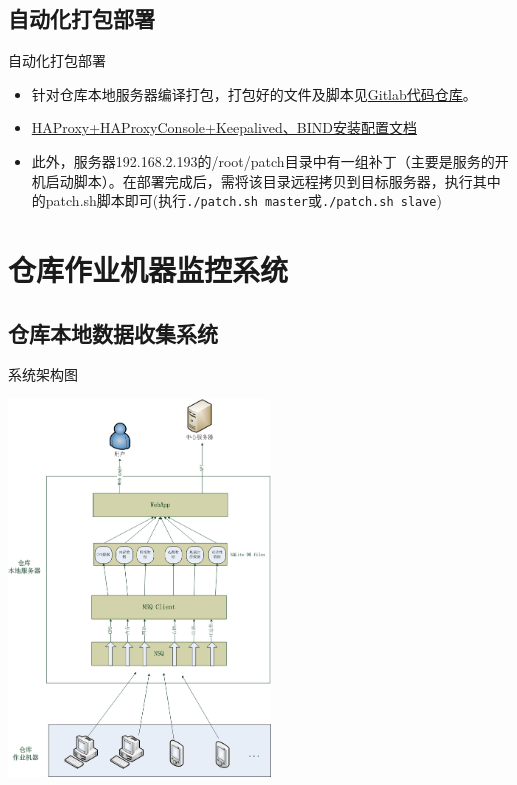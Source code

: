 \documentclass[CJK]{beamer}
\begin{document}
\begin{CJK*}{UTF8}{gbsn}
\subsection{自动化打包部署}
\begin{frame}[containsverbatim]{自动化打包部署}
\begin{itemize}
\item 针对仓库本地服务器编译打包，打包好的文件及脚本见\href{http://10.24.178.60:8000/yongfengxia/deploy_packages}{Gitlab代码仓库}。
\item \href{run:HAProxy_HAProxyConsole_Keepalived_BIND_Installation.pdf}{HAProxy+HAProxyConsole+Keepalived、BIND安装配置文档}
\item 此外，服务器192.168.2.193的/root/patch目录中有一组补丁（主要是服务的开机启动脚本）。在部署完成后，需将该目录远程拷贝到目标服务器，执行其中的patch.sh脚本即可(执行\verb"./patch.sh master"或\verb"./patch.sh slave")
\end{itemize}
\end{frame}

\section{仓库作业机器监控系统}

\subsection{仓库本地数据收集系统}

\begin{frame}{系统架构图}
\begin{center}
\includegraphics[height=10cm, angle=90]{inner_warehouse_monitor-arch.png}
\end{center}
\end{frame}


\end{CJK*}
\end{document}
